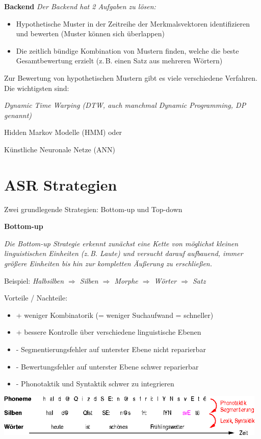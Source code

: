 \documentclass[11pt]{book}
\newcommand{\vsph}{\vspace*{0.5cm}}
\newcommand{\begi}{\begin{itemize} \setlength{\itemsep}{0.2cm}}
\newcommand{\ndit}{\end{itemize}}
\begin{document}
{\bf Backend}
{\em Der Backend hat 2 Aufgaben zu lösen:}
\vsph
\begi
\item Hypothetische Muster in der Zeitreihe der Merkmalsvektoren 
identifizieren und bewerten (Muster können sich überlappen)
\item Die zeitlich bündige Kombination von Mustern finden, welche die
beste Gesamtbewertung erzielt (z.\,B. einen Satz aus mehreren Wörtern)
\ndit
\vsph
Zur Bewertung von hypothetischen Mustern gibt es viele verschiedene 
Verfahren. Die wichtigsten sind: 
\begi
\item {\em Dynamic Time Warping (DTW, auch manchmal
Dynamic Programming, DP genannt) 
\item Hidden Markov Modelle (HMM) oder 
\item Künstliche Neuronale Netze (ANN)}
\ndit


\section{ASR Strategien}
Zwei grundlegende Strategien: Bottom-up und Top-down

{\bf Bottom-up}

{\em Die Bottom-up Strategie erkennt zunächst eine Kette von möglichst
kleinen linguistischen Einheiten (z.\,B. Laute) und versucht darauf aufbauend,
immer größere Einheiten bis hin zur kompletten Äußerung zu erschließen.}

Beispiel: {\em Halbsilben $\Rightarrow$ Silben $\Rightarrow$ Morphe $\Rightarrow$ Wörter $\Rightarrow$ Satz}

Vorteile / Nachteile:
\begi
\item {+ weniger Kombinatorik (= weniger Suchaufwand = schneller)}
\item {+ bessere Kontrolle über verschiedene linguistische Ebenen}
\item {- Segmentierungsfehler auf unterster Ebene nicht reparierbar}
\item {- Bewertungsfehler auf unterster Ebene schwer reparierbar}
\item {- Phonotaktik und Syntaktik schwer zu integrieren}
\ndit

\centerline{\includegraphics[width=13cm]{grafiken/automatische-spracherkennung/bott.png}}
\end{document}
